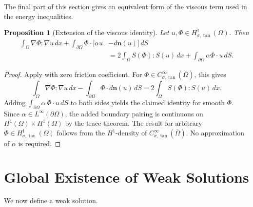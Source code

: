 \documentclass[11pt,reqno]{amsart}
\theoremstyle{plain}
\newtheorem{proposition}[thm]{Proposition}
\numberwithin{equation}{section}
\begin{document}
The final part of this section gives an equivalent form of the viscous term used in the energy inequalities.

\begin{proposition}[Extension of the viscous identity]\label{prop2.3}
Let $u,\Phi\in H^1_{\sigma,\tan}(\Omega)$. Then
\begin{equation*}
    \begin{split}
        \int_{\Omega} \nabla \Phi: \nabla u \,dx+\int_{\partial \Omega} \Phi \cdot[\alpha u &-d\boldsymbol{n}(u)] \,dS \\
        & =2\int_{\Omega} S(\Phi):S(u)\,dx+\int_{\partial \Omega} \alpha \Phi \cdot u\,dS.
    \end{split}
\end{equation*}
\end{proposition}
\begin{proof}
{Apply \cite[Proposition~4.3]{Kelliher2025} with zero
friction coefficient. For
\(\Phi\in C^\infty_{\sigma,\tan}(\overline\Omega)\), this gives}
\[
{
\int_\Omega\nabla\Phi:\nabla u\,dx
-\int_{\partial\Omega}\Phi\cdot d\boldsymbol n(u)\,dS
=
2\int_\Omega S(\Phi):S(u)\,dx.}
\]
{Adding
\(\int_{\partial\Omega}\alpha\,\Phi\cdot u\,dS\) to both sides yields the
claimed identity for smooth \(\Phi\). Since
\(\alpha\in L^\infty(\partial\Omega)\), the added boundary pairing is
continuous on \(H^1(\Omega)\times H^1(\Omega)\) by the trace theorem.
The result for arbitrary
\(\Phi\in H^1_{\sigma,\tan}(\Omega)\) follows from the
\(H^1\)-density of
\(C^\infty_{\sigma,\tan}(\overline\Omega)\). No approximation of
\(\alpha\) is required.}
\end{proof}

\section{Global Existence of Weak Solutions}\label{sec3}

We now define a weak solution.
\end{document}
